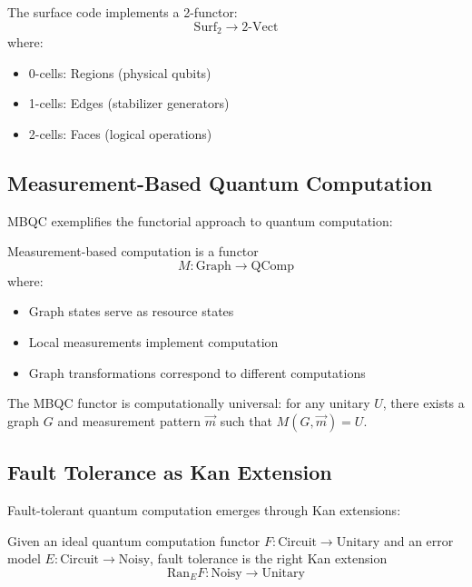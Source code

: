 \begin{example}
The surface code implements a 2-functor:
\[
\text{Surf}_2 \to \text{2-Vect}
\]
where:
\begin{itemize}
\item 0-cells: Regions (physical qubits)
\item 1-cells: Edges (stabilizer generators)
\item 2-cells: Faces (logical operations)
\end{itemize}
\end{example}

\subsection{Measurement-Based Quantum Computation}

MBQC exemplifies the functorial approach to quantum computation:

\begin{definition}
Measurement-based computation is a functor
\[
M: \text{Graph} \to \text{QComp}
\]
where:
\begin{itemize}
\item Graph states serve as resource states
\item Local measurements implement computation
\item Graph transformations correspond to different computations
\end{itemize}
\end{definition}

\begin{theorem}
The MBQC functor is computationally universal: for any unitary $U$, there exists a graph $G$ and measurement pattern $\vec{m}$ such that $M(G, \vec{m}) = U$.
\end{theorem}

\subsection{Fault Tolerance as Kan Extension}

Fault-tolerant quantum computation emerges through Kan extensions:

\begin{definition}
Given an ideal quantum computation functor $F: \text{Circuit} \to \text{Unitary}$ and an error model $E: \text{Circuit} \to \text{Noisy}$, fault tolerance is the right Kan extension
\[
\text{Ran}_E F: \text{Noisy} \to \text{Unitary}
\]
\end{definition}

